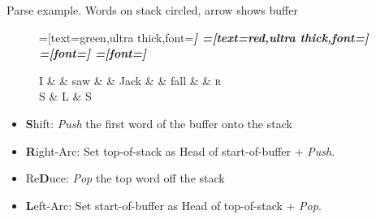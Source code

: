 \documentclass{lecture}
\begin{document}
\begin{plain}{Parse example. Words on stack circled, arrow shows buffer}
\begin{figure}
    \centering
    \begin{dependency}[theme=simple]
    =[text=green,ultra thick,font=\bfseries\itshape]
    =[text=red,ultra thick,font=\bfseries\itshape]
    =[font=\bfseries\itshape]
    =[font=\itshape]
    \begin{deptext}[column sep=.075cm, row sep=.1ex]
        I \&           \& saw \&          \& Jack       \& \& fall   \& \& \textsc{r} \\
      S   \& L \& S \\ 
    \end{deptext}
\end{dependency}
\end{figure}
    \begin{itemize}
        \item \textbf{S}hift: \emph{Push} the first word of the buffer onto the stack
    \item \textbf{R}ight-Arc: Set top-of-stack as Head of start-of-buffer + \emph{Push}.
    \item Re\textbf{D}uce: \emph{Pop} the top word off the stack
    \item \textbf{L}eft-Arc: Set start-of-buffer as Head of top-of-stack + \emph{Pop}.
    \end{itemize}
\end{plain}
\end{document}

